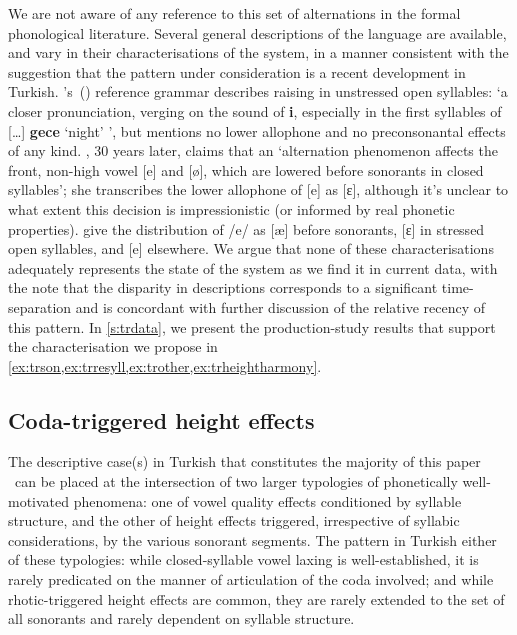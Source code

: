 We are not aware of any reference to this set of alternations in the formal phonological literature. Several general descriptions of the language are available, and vary in their characterisations of the system, in a manner consistent with the suggestion that the pattern under consideration is a recent development in Turkish. \citeauthor{Lewis1967}'s\ (\citeyear[14]{Lewis1967}) reference grammar describes raising in unstressed open syllables: `a closer pronunciation, verging on the sound of {\bf i}, especially in the first syllables of [\ldots] {\bf gece} `night' ', but mentions no lower allophone and no preconsonantal effects of any kind. \citet[512]{Kornfilt1997}, 30 years later, claims that an `alternation phenomenon affects the front, non-high vowel [e] and [ø], which are lowered before sonorants in closed syllables'; she transcribes the lower allophone of [e] as [ɛ], although it's unclear to what extent this decision is impressionistic (or informed by real phonetic properties). \citet{Goksel2005} give the distribution of /e/ as [æ] before sonorants, [ɛ] in stressed open syllables, and [e] elsewhere. We argue that none of these characterisations adequately represents the state of the system as we find it in current data, with the note that the disparity in descriptions corresponds to a significant time-separation and is concordant with further discussion of the relative recency of this pattern. In \cref{s:trdata}, we present the production-study results that support the characterisation we propose in \cref{ex:trson,ex:trresyll,ex:trother,ex:trheightharmony}.



\subsection{Coda-triggered height effects}\label{ss:coda_effects}

The descriptive case(s) in Turkish that constitutes the majority of this paper \ can be placed at the intersection of two larger typologies of phonetically well-motivated phenomena: one of vowel quality effects conditioned by syllable structure, and the other of height effects triggered, irrespective of syllabic considerations, by the various sonorant segments. The pattern in Turkish  either of these typologies: while closed-syllable vowel laxing is well-established, it is rarely predicated on the manner of articulation of the coda involved; and while rhotic-triggered height effects are common, they are rarely extended to the set of all sonorants and rarely dependent on syllable structure.

